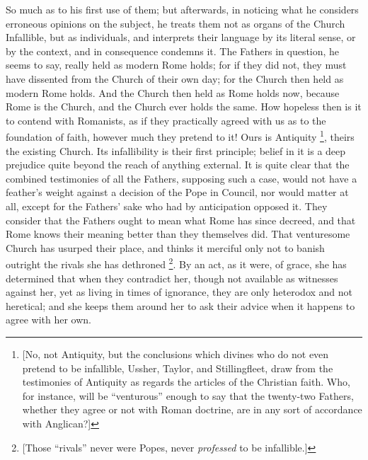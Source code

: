 So much as to his first use of them; but afterwards, in noticing
what he considers erroneous opinions on the subject, he treats them
not as organs of the Church Infallible, but as individuals, and
interprets their language by its literal sense, or by the context, and
in consequence condemns it. The Fathers in question, he seems to say,
really held as modern Rome holds; for if they did not, they must have
dissented from the Church of their own day; for the Church then held
as modern Rome holds. And the Church then held as Rome holds now,
because Rome is the Church, and the Church ever holds the same. How
hopeless then is it to contend with Romanists, as if they practically
agreed with us as to the foundation of faith, however much they
pretend to it! Ours is Antiquity \footnote{[No, not Antiquity, but the conclusions
which divines who do not even pretend to be infallible, Ussher,
Taylor, and Stillingfleet, draw from the testimonies of Antiquity as
regards the articles of the Christian faith. Who, for instance, will
be ``venturous'' enough to say that the twenty-two Fathers,
whether they agree or not with Roman doctrine, are in any sort of
accordance with Anglican?]}, theirs the existing Church. Its infallibility is their first
principle; belief in it is a deep prejudice quite beyond the reach of
anything external. It is quite clear that the combined testimonies of
all the Fathers, supposing such a case, would not have a feather's
weight against a decision of the Pope in Council, nor would matter at
all, except for the Fathers' sake who had by anticipation opposed it.
They consider that the Fathers ought to mean what Rome has since
decreed, and that Rome knows their meaning better than they themselves
did. That venturesome Church has usurped their place, and thinks it
merciful only not to banish outright the rivals she has dethroned \footnote{[Those ``rivals'' never were
Popes, never \emph{professed} to be infallible.]}. By an act, as it were, of grace, she has determined that
when they contradict her, though not available as witnesses against
her, yet as living in times of ignorance, they are only heterodox and
not heretical; and she keeps them around her to ask their advice when
it happens to agree with her own.

